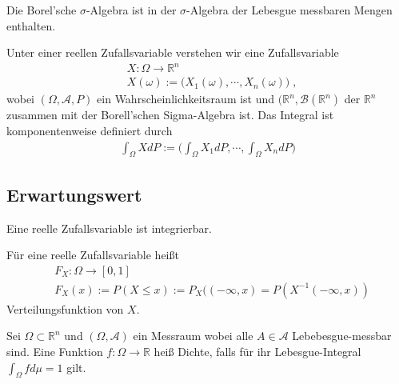 \begin{Satz}
Die Borel'sche   $\sigma$-Algebra ist in der $\sigma$-Algebra der Lebesgue messbaren Mengen enthalten.
\end{Satz}

\begin{Definition}
Unter einer reellen Zufallsvariable verstehen wir eine Zufallsvariable 
\begin{align*}
& X : \Omega \to \mathbb{R}^n \\
& X(\omega) := \biggl(X_1(\omega), \cdots , X_n(\omega)  \biggr) \; ,
\end{align*}
wobei $(\Omega, \mathcal{A}, P)$ ein Wahrscheinlichkeitsraum ist und $(\mathbb{R}^n, \mathcal{B}(\mathbb{R}^n)$ der $\mathbb{R}^n$ zusammen mit der Borell'schen Sigma-Algebra ist. Das Integral ist komponentenweise definiert durch
\begin{align*} 
\int_{\Omega} X dP :=  \biggl( \int_{\Omega} X_1 dP, \cdots , \int_{\Omega} X_n dP    \biggr)
\end{align*}

\end{Definition}


\subsection{Erwartungswert}
\begin{Satz}
Eine reelle Zufallsvariable ist integrierbar.
\end{Satz}

\begin{Definition}
Für eine reelle Zufallsvariable heißt 
\begin{align*} 
& F_X : \Omega \to [0,1] \\
& F_X (x) := P (X \leq x) := P_X (( -\infty, x ) = P(X^{-1} (-\infty, x))
\end{align*}
Verteilungsfunktion von $X$.
\end{Definition}




\begin{Definition}
Sei $\Omega \subset \mathbb{R}^n$ und $(\Omega, \mathcal{A})$ ein Messraum wobei alle $A \in \mathcal{A}$ Lebebesgue-messbar sind.
 Eine Funktion $f: \Omega \to \mathbb{R}$ heiß Dichte, falls für ihr Lebesgue-Integral $\int_{\Omega} f d \mu = 1$ gilt.
\end{Definition}

